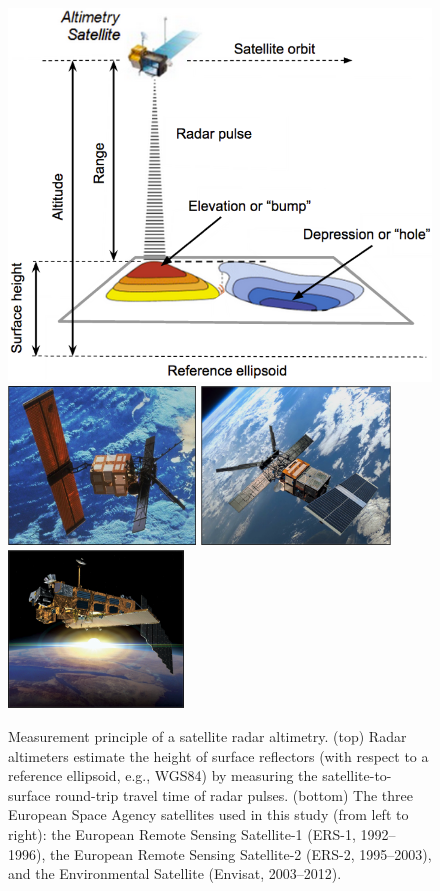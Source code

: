 \begin{figure}[!ht]
  \centering
  \includegraphics[width=.75\textwidth]{img/altimetry_principle.png} \\[.5cm]
  \includegraphics[height=4.2cm]{img/ers1.png}
  \includegraphics[height=4.2cm]{img/ers2.png}
  \includegraphics[height=4.2cm]{img/envisat.png}
  \caption[Measurement principle of satellite radar altimetry]{
  Measurement principle of a satellite radar altimetry. (top) Radar altimeters estimate the height of surface reflectors (with respect to a reference ellipsoid, e.g., WGS84) by measuring the satellite-to-surface round-trip travel time of radar pulses. (bottom) The three European Space Agency satellites used in this study (from left to right): the European Remote Sensing Satellite-1 (ERS-1, 1992--1996), the European Remote Sensing Satellite-2 (ERS-2, 1995--2003), and the Environmental Satellite (Envisat, 2003--2012).
  }
  \label{fig:ra-principle}
\end{figure}
\clearpage

